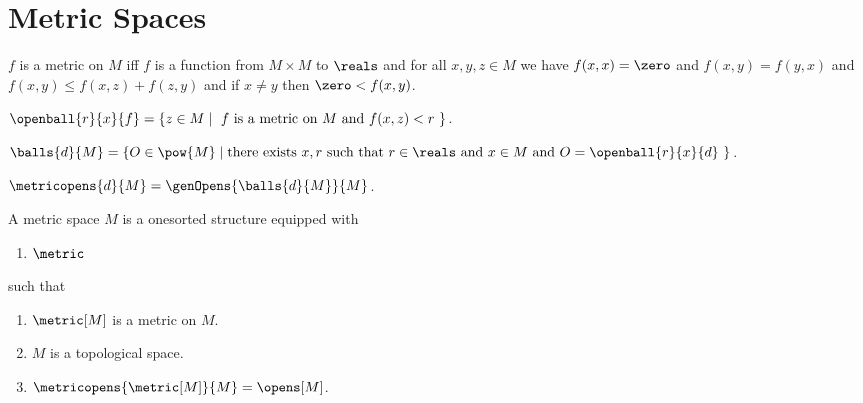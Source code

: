 





\section{Metric Spaces}

\begin{definition}\label{metric}
    $f$ is a metric on $M$ iff $f$ is a function from $M \times M$ to $\reals$ and
    for all $x,y,z \in M$ we have 
        $f(x,x) = \zero$ and 
        $f(x,y) = f(y,x)$ and
        $f(x,y) \leq f(x,z) + f(z,y)$ and
        if $x \neq y$ then $\zero < f(x,y)$.
\end{definition}

\begin{definition}\label{open_ball}
    $\openball{r}{x}{f} = \{z \in M \mid \text{ $f$ is a metric on $M$ and $f(x,z) < r$ } \}$.
\end{definition}



\begin{definition}\label{set_of_balls}
    $\balls{d}{M} = \{ O \in \pow{M} \mid \text{there exists $x,r$ such that $r \in \reals$ and $x \in M$ and $O = \openball{r}{x}{d}$ } \}$.
\end{definition}


\begin{definition}\label{metricopens}
    $\metricopens{d}{M} = \genOpens{\balls{d}{M}}{M}$.
\end{definition}







\begin{struct}\label{metric_space}  
    A metric space $M$ is a onesorted structure equipped with
    \begin{enumerate}
        \item $\metric$
    \end{enumerate}
    such that
    \begin{enumerate}
        \item \label{metric_space_metric}                   $\metric[M]$ is a metric on $M$.
        \item \label{metric_space_topology}                 $M$ is a topological space.
        \item \label{metric_space_opens}                    $\metricopens{ \metric[M] }{M} = \opens[M]$.
    \end{enumerate}
\end{struct}

